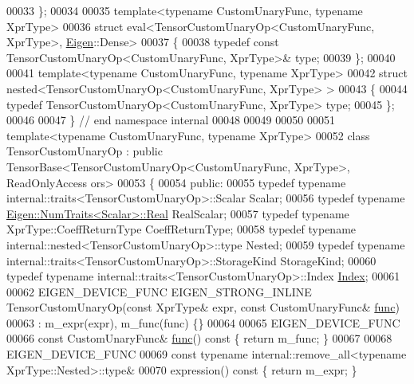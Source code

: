 \begin{DoxyCode}
00033 \};
00034 
00035 \textcolor{keyword}{template}<\textcolor{keyword}{typename} CustomUnaryFunc, \textcolor{keyword}{typename} XprType>
00036 \textcolor{keyword}{struct }eval<TensorCustomUnaryOp<CustomUnaryFunc, XprType>, \hyperlink{namespace_eigen}{Eigen}::Dense>
00037 \{
00038   \textcolor{keyword}{typedef} \textcolor{keyword}{const} TensorCustomUnaryOp<CustomUnaryFunc, XprType>& type;
00039 \};
00040 
00041 \textcolor{keyword}{template}<\textcolor{keyword}{typename} CustomUnaryFunc, \textcolor{keyword}{typename} XprType>
00042 \textcolor{keyword}{struct }nested<TensorCustomUnaryOp<CustomUnaryFunc, XprType> >
00043 \{
00044   \textcolor{keyword}{typedef} TensorCustomUnaryOp<CustomUnaryFunc, XprType> type;
00045 \};
00046 
00047 \}  \textcolor{comment}{// end namespace internal}
00048 
00049 
00050 
00051 \textcolor{keyword}{template}<\textcolor{keyword}{typename} CustomUnaryFunc, \textcolor{keyword}{typename} XprType>
00052 \textcolor{keyword}{class }TensorCustomUnaryOp : \textcolor{keyword}{public} TensorBase<TensorCustomUnaryOp<CustomUnaryFunc, XprType>, ReadOnlyAccess
      ors>
00053 \{
00054   \textcolor{keyword}{public}:
00055   \textcolor{keyword}{typedef} \textcolor{keyword}{typename} internal::traits<TensorCustomUnaryOp>::Scalar Scalar;
00056   \textcolor{keyword}{typedef} \textcolor{keyword}{typename} \hyperlink{group___sparse_core___module}{Eigen::NumTraits<Scalar>::Real} RealScalar;
00057   \textcolor{keyword}{typedef} \textcolor{keyword}{typename} XprType::CoeffReturnType CoeffReturnType;
00058   \textcolor{keyword}{typedef} \textcolor{keyword}{typename} internal::nested<TensorCustomUnaryOp>::type Nested;
00059   \textcolor{keyword}{typedef} \textcolor{keyword}{typename} internal::traits<TensorCustomUnaryOp>::StorageKind StorageKind;
00060   \textcolor{keyword}{typedef} \textcolor{keyword}{typename} internal::traits<TensorCustomUnaryOp>::Index \hyperlink{namespace_eigen_a62e77e0933482dafde8fe197d9a2cfde}{Index};
00061 
00062   EIGEN\_DEVICE\_FUNC EIGEN\_STRONG\_INLINE TensorCustomUnaryOp(\textcolor{keyword}{const} XprType& expr, \textcolor{keyword}{const} CustomUnaryFunc& 
      \hyperlink{structfunc}{func})
00063       : m\_expr(expr), m\_func(func) \{\}
00064 
00065   EIGEN\_DEVICE\_FUNC
00066   \textcolor{keyword}{const} CustomUnaryFunc& \hyperlink{structfunc}{func}()\textcolor{keyword}{ const }\{ \textcolor{keywordflow}{return} m\_func; \}
00067 
00068   EIGEN\_DEVICE\_FUNC
00069   \textcolor{keyword}{const} \textcolor{keyword}{typename} internal::remove\_all<typename XprType::Nested>::type&
00070   expression()\textcolor{keyword}{ const }\{ \textcolor{keywordflow}{return} m\_expr; \}

\end{DoxyCode}
